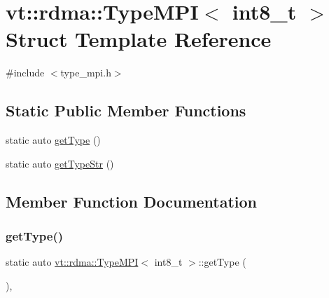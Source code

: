 \hypertarget{structvt_1_1rdma_1_1_type_m_p_i_3_01int8__t_01_4}{}\section{vt\+:\+:rdma\+:\+:Type\+M\+PI$<$ int8\+\_\+t $>$ Struct Template Reference}
\label{structvt_1_1rdma_1_1_type_m_p_i_3_01int8__t_01_4}


{\ttfamily \#include $<$type\+\_\+mpi.\+h$>$}

\subsection*{Static Public Member Functions}
\begin{DoxyCompactItemize}
\item 
static auto \hyperlink{structvt_1_1rdma_1_1_type_m_p_i_3_01int8__t_01_4_a88c1285ee7662f56db74b312f65d61fe}{get\+Type} ()
\item 
static auto \hyperlink{structvt_1_1rdma_1_1_type_m_p_i_3_01int8__t_01_4_af47196464894d2fa59fad5ad0378652c}{get\+Type\+Str} ()
\end{DoxyCompactItemize}


\subsection{Member Function Documentation}
\mbox{\label{structvt_1_1rdma_1_1_type_m_p_i_3_01int8__t_01_4_a88c1285ee7662f56db74b312f65d61fe}} 
\subsubsection{\texorpdfstring{get\+Type()}{getType()}}
{\footnotesize\ttfamily static auto \hyperlink{structvt_1_1rdma_1_1_type_m_p_i}{vt\+::rdma\+::\+Type\+M\+PI}$<$ int8\+\_\+t $>$\+::get\+Type (\begin{DoxyParamCaption}{ }\end{DoxyParamCaption})\hspace{0.3cm}{\ttfamily [inline]}, {\ttfamily [static]}}

